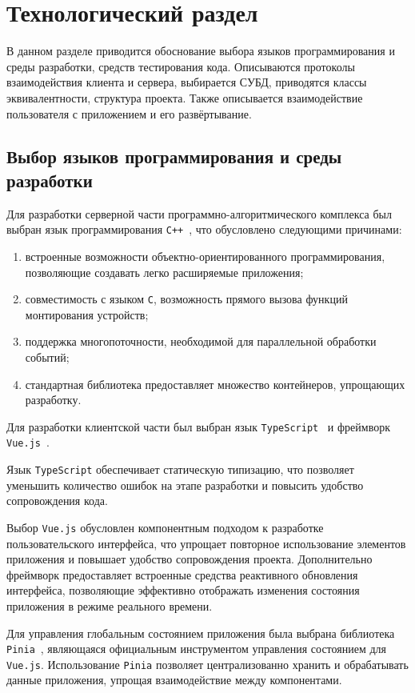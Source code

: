 \chapter{Технологический раздел}

В данном разделе приводится обоснование выбора языков программирования
и среды разработки, средств тестирования кода. Описываются протоколы взаимодействия
клиента и сервера, выбирается СУБД, приводятся классы эквивалентности,
структура проекта. Также описывается взаимодействие пользователя с приложением
и его развёртывание.

\section{Выбор языков программирования и среды разработки}

Для разработки серверной части программно-алгоритмического комплекса был выбран язык
программирования \texttt{C++}~\cite{Cpp}, что обусловлено следующими причинами:
\begin{enumerate}
    \item встроенные возможности объектно-ориентированного программирования, позволяющие
создавать легко расширяемые приложения;
    \item совместимость с языком \texttt{C}, возможность прямого вызова функций монтирования устройств;
    \item поддержка многопоточности, необходимой для параллельной обработки событий;
    \item стандартная библиотека предоставляет множество контейнеров, упрощающих разработку.
\end{enumerate}

Для разработки клиентской части был выбран язык \texttt{TypeScript}~\cite{TypeScript} и фреймворк \texttt{Vue.js}~\cite{VueJS}. 

Язык \texttt{TypeScript} обеспечивает статическую типизацию, что позволяет уменьшить количество ошибок на 
этапе разработки и повысить удобство сопровождения кода.

Выбор \texttt{Vue.js} обусловлен компонентным подходом к разработке пользовательского интерфейса, что упрощает 
повторное использование элементов приложения и повышает удобство сопровождения проекта. Дополнительно 
фреймворк предоставляет встроенные средства реактивного обновления интерфейса, позволяющие эффективно 
отображать изменения состояния приложения в режиме реального времени.

Для управления глобальным состоянием приложения была выбрана библиотека \texttt{Pinia}~\cite{Pinia}, являющаяся
официальным инструментом управления состоянием для \texttt{Vue.js}. Использование \texttt{Pinia} позволяет централизованно
хранить и обрабатывать данные приложения, упрощая взаимодействие между компонентами.

